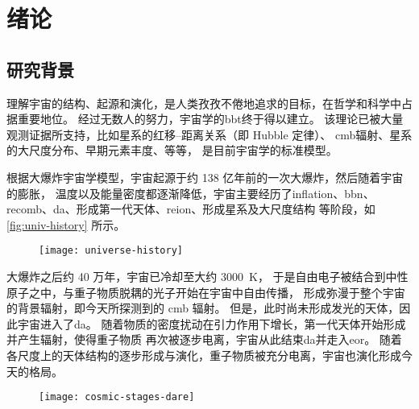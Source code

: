 
\chapter{绪论}
\label{chap:introduction}

\section{研究背景}
\label{sec:background}

理解宇宙的结构、起源和演化，是人类孜孜不倦地追求的目标，在哲学和科学中占据重要地位。
经过无数人的努力，宇宙学的\ac{bbt}终于得以建立。
该理论已被大量观测证据所支持，比如星系的红移--距离关系（即 Hubble 定律）、
\ac{cmb}辐射、星系的大尺度分布、早期元素丰度、等等，
是目前宇宙学的标准模型。

根据大爆炸宇宙学模型，宇宙起源于约 138 亿年前的一次大爆炸，然后随着宇宙的膨胀，
温度以及能量密度都逐渐降低，宇宙主要经历了\ac{inflation}、\ac{bbn}、
\ac{recomb}、\ac{da}、形成第一代天体、\ac{reion}、形成星系及大尺度结构
等阶段，如\autoref{fig:univ-history} 所示。

\begin{figure}[!htp]
  \centering
  \texttt{[image: universe-history]}
  \label{fig:univ-history}
\end{figure}

大爆炸之后约 40 万年，宇宙已冷却至大约 \SI{3000}{\kelvin}，
于是自由电子被结合到中性原子之中，与重子物质脱耦的光子开始在宇宙中自由传播，
形成弥漫于整个宇宙的背景辐射，即今天所探测到的 \ac{cmb} 辐射。
但是，此时尚未形成发光的天体，因此宇宙进入了\acl{da}。
随着物质的密度扰动在引力作用下增长，第一代天体开始形成并产生辐射，使得重子物质
再次被逐步电离，宇宙从此结束\acl{da}并走入\ac{eor}。
随着各尺度上的天体结构的逐步形成与演化，重子物质被充分电离，宇宙也演化形成今天的格局。

\begin{figure}[!htp]
  \centering
  \texttt{[image: cosmic-stages-dare]}
  \label{fig:cosmic-stages}
\end{figure}

